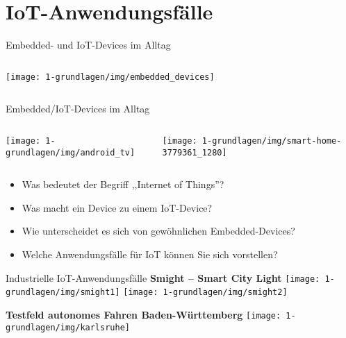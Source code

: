 \section{IoT-Anwendungsfälle}

\begin{frame}{Embedded- und IoT-Devices im Alltag}
    \begin{columns}
        \column{\dimexpr\paperwidth-28pt}
        \texttt{[image: 1-grundlagen/img/embedded\_devices]}
    \end{columns}
\end{frame}

\begin{frame}{Embedded/IoT-Devices im Alltag}
    \begin{columns}
        \begin{column}[b]{.5\textwidth}
            \begin{center}
                \texttt{[image: 1-grundlagen/img/android\_tv]}
            \end{center}
        \end{column}
        \begin{column}[b]{.5\textwidth}
            \begin{center}
                \texttt{[image: 1-grundlagen/img/smart-home-3779361\_1280]}
            \end{center}
        \end{column}
    \end{columns}

    \bigskip

    \begin{itemize}
        \item Was bedeutet der Begriff ,,Internet of Things''?
        \item Was macht ein Device zu einem IoT-Device?
        \item Wie unterscheidet es sich von gewöhnlichen Embedded-Devices?
        \item Welche Anwendungsfälle für IoT können Sie sich vorstellen?
    \end{itemize}
\end{frame}

\begin{frame}{Industrielle IoT-Anwendungsfälle}
    \textbf{Smight -- Smart City Light}
    \hfill
    \medskip
    \texttt{[image: 1-grundlagen/img/smight1]}
    \hfill
    \texttt{[image: 1-grundlagen/img/smight2]}

    \bigskip

    \textbf{Testfeld autonomes Fahren Baden-Württemberg}
    \hfill
    \medskip
    \texttt{[image: 1-grundlagen/img/karlsruhe]}
\end{frame}

